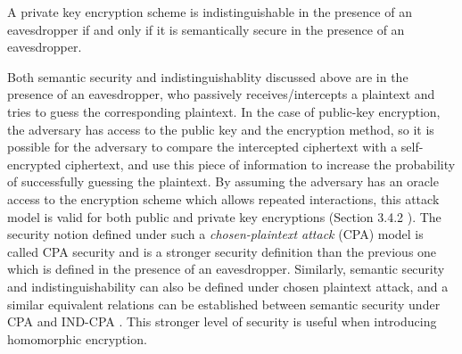 \documentclass[../main.tex]{subfiles}
\begin{document}
\begin{theorem}
	A private key encryption scheme is indistinguishable in the presence of an eavesdropper if and only if it is semantically secure in the presence of an eavesdropper. 
\end{theorem}

Both semantic security and indistinguishablity discussed above are in the presence of an eavesdropper, who passively receives/intercepts a plaintext and tries to guess the corresponding plaintext. In the case of public-key encryption, the adversary has access to the public key and the encryption method, so it is possible for the adversary to compare the intercepted ciphertext with a self-encrypted ciphertext, and use this piece of information to increase the probability of successfully guessing the plaintext. By assuming the adversary has an oracle access to the encryption scheme which allows repeated interactions, this attack model is valid for both public and private key encryptions (Section 3.4.2 \cite{katz2014introduction}). The security notion defined under such a \textit{chosen-plaintext attack} (CPA)  model is called CPA security and is a stronger security definition than the previous one which is defined in the presence of an eavesdropper. Similarly, semantic security and indistinguishability can also be defined under chosen plaintext attack, and a similar equivalent relations can be established between semantic security under CPA and IND-CPA . This stronger level of security is useful when introducing homomorphic encryption. 




\end{document}
